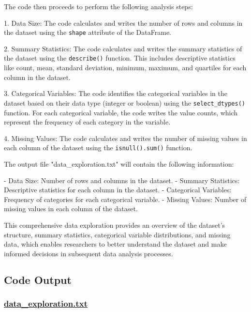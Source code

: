 \documentclass[11pt]{article}
\begin{document}
The code then proceeds to perform the following analysis steps:

1. Data Size: The code calculates and writes the number of rows and columns in the dataset using the \texttt{shape} attribute of the DataFrame.

2. Summary Statistics: The code calculates and writes the summary statistics of the dataset using the \texttt{describe()} function. This includes descriptive statistics like count, mean, standard deviation, minimum, maximum, and quartiles for each column in the dataset.

3. Categorical Variables: The code identifies the categorical variables in the dataset based on their data type (integer or boolean) using the \texttt{select\_dtypes()} function. For each categorical variable, the code writes the value counts, which represent the frequency of each category in the variable.

4. Missing Values: The code calculates and writes the number of missing values in each column of the dataset using the \texttt{isnull().sum()} function.

The output file "data\_exploration.txt" will contain the following information:

- Data Size: Number of rows and columns in the dataset.
- Summary Statistics: Descriptive statistics for each column in the dataset.
- Categorical Variables: Frequency of categories for each categorical variable.
- Missing Values: Number of missing values in each column of the dataset.

This comprehensive data exploration provides an overview of the dataset's structure, summary statistics, categorical variable distributions, and missing data, which enables researchers to better understand the dataset and make informed decisions in subsequent data analysis processes.

\subsection{Code Output}\hypertarget{file-data-exploration-txt}{}

\subsubsection*{\hyperlink{code-Data Exploration-data-exploration-txt}{data\_exploration.txt}}
\end{document}
